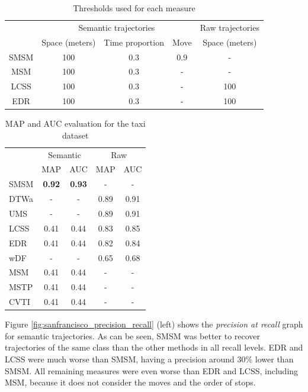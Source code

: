 \documentclass[12pt]{article}
\begin{document}
\begin{table}[!h]
\scriptsize
  \centering
  \begin{tabular}{|c|c|c|c|c|}
  	\hline
  & \multicolumn{3}{c|}{Semantic trajectories} & \multicolumn{1}{c|}{Raw trajectories} \\
 	\cline{2-5}
  & Space (meters) & Time proportion & Move & Space (meters) \\
  	\hline
 SMSM & 100 & 0.3 & 0.9 & - \\
 MSM & 100 & 0.3 & - & - \\
 LCSS & 100 & 0.3 & - & 100 \\
 EDR & 100 & 0.3 & - & 100 \\
    \hline
  \end{tabular}
  \caption{Thresholds used for each measure}
  \label{tab:san_francisco_thresholds}
\end{table}


\begin{table}[h]
\scriptsize
  \centering
  \begin{tabular}{|l|c|c|c|c|}
  	\hline
 & \multicolumn{2}{c}{Semantic} & \multicolumn{2}{|c|}{Raw} \\
 	\cline{2-5}
 & MAP & AUC & MAP & AUC \\
  	\hline
SMSM & \textbf{0.92} & \textbf{0.93} & - & -\\
DTWa & - & - & 0.89 & 0.91 \\
UMS & - & - & 0.89 & 0.91 \\
LCSS & 0.41 & 0.44 & 0.83 & 0.85 \\
EDR & 0.41 & 0.44 & 0.82 & 0.84 \\
wDF & - & - & 0.65 & 0.68 \\
MSM & 0.41 & 0.44 & - & - \\
MSTP & 0.41 & 0.44 & - & - \\
CVTI & 0.41 & 0.44 & - & - \\
    \hline
  \end{tabular}
  \caption{MAP and AUC evaluation for the {taxi} dataset}
  \label{tab:sanfrancisco_measures_map_auc}
\end{table}

{Figure {\ref{fig:sanfrancisco_precision_recall}} (left) shows the \emph{precision at recall} graph for semantic trajectories. As can be seen, SMSM was better to recover trajectories of the same class than the other methods in all recall levels. EDR and LCSS were much worse than SMSM, having a precision around 30\% lower than SMSM.  All remaining measures were even worse than EDR and LCSS, including MSM, because it does not consider the moves and the order of stops.}
\end{document}
